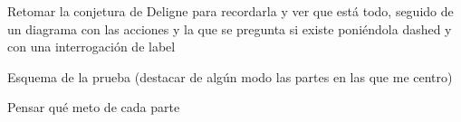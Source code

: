 \documentclass{beamer}
\theoremstyle{definition}
\begin{document}
\begin{frame}
	Retomar la conjetura de Deligne para recordarla y ver que está todo, seguido de un diagrama con las acciones y la que se pregunta si existe poniéndola dashed y con una interrogación de label
	
	Esquema de la prueba (destacar de algún modo las partes en las que me centro)
	
	Pensar qué meto de cada parte
\end{frame}
\end{document}
